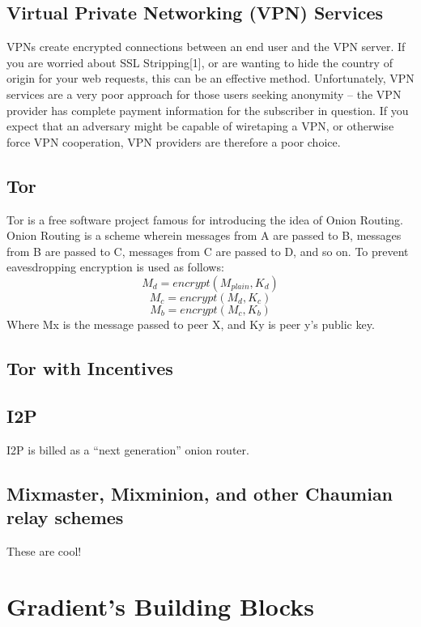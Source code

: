 \documentclass{article}
\begin{document}
\subsection{Virtual Private Networking (VPN) Services}

VPNs create encrypted connections between an end user and the VPN server. If you are worried about SSL Stripping[1], or are wanting to hide the country of origin for your web requests, this can be an effective method. Unfortunately, VPN services are a very poor approach for those users seeking anonymity – the VPN provider has complete payment information for the subscriber in question. If you expect that an adversary might be capable of wiretaping a VPN, or otherwise force VPN cooperation, VPN providers are therefore a poor choice.

\subsection{Tor}

Tor is a free software project famous for introducing the idea of Onion Routing. Onion Routing is a scheme wherein messages from A are passed to B, messages from B are passed to C, messages from C are passed to D, and so on. To prevent eavesdropping encryption is used as follows:
$$M_d = encrypt(M_{plain}, K_d)$$
$$M_c = encrypt(M_d, K_c)$$
$$M_b = encrypt(M_c, K_b)$$
Where Mx is the message passed to peer X, and Ky is peer y’s public key.

\subsection{Tor with Incentives}

\subsection{I2P}

I2P is billed as a “next generation” onion router.

\subsection{Mixmaster, Mixminion, and other Chaumian relay schemes}

These are cool!

\section{Gradient’s Building Blocks}
\label{sec:building-blocks}
\end{document}
